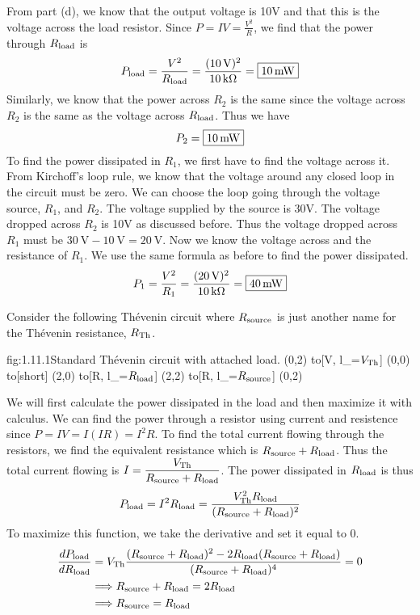 \begin{enumerate}
    From part (d), we know that the output voltage is 10V and that this is the voltage across the load resistor. Since $P = IV = \frac{V^2}{R}$, we find that the power through $R_{\text{load}}$ is 
    \[P_\load = \frac{V^2}{R_\load} = \frac{(\SI{10}{\V})^2}{\SI{10}{\kohm}} = \mans{\SI{10}{\mW}}\]
    Similarly, we know that the power across $R_2$ is the same since the voltage across $R_2$ is the same as the voltage across $R_{\text{load}}$. Thus we have
    \[P_2 = \mans{\SI{10}{\mW}}\]
    To find the power dissipated in $R_1$, we first have to find the voltage across it. From Kirchoff's loop rule, we know that the voltage around any closed loop in the circuit must be zero. We can choose the loop going through the voltage source, $R_1$, and $R_2$. The voltage supplied by the source is 30V. The voltage dropped across $R_2$ is 10V as discussed before. Thus the voltage dropped across $R_1$ must be $\SI{30}{\V} - \SI{10}{\V} = \SI{20}{\V}$. Now we know the voltage across and the resistance of $R_1$. We use the same formula as before to find the power dissipated.
    \[P_1 = \frac{V^2}{R_1} = \frac{(\SI{20}{\V})^2}{\SI{10}{\kohm}} = \mans{\SI{40}{\mW}}\]
\end{enumerate}

Consider the following Th\'evenin circuit where $R_{\text{source}}$ is just another name for the Th\'evenin resistance, $R_{\text{Th}}$.
\begin{circuit}{fig:1.11.1}{Standard Th\'evenin circuit with attached load.}
    (0,2) to[V, l_=$V_{\text{Th}}$] (0,0)
        to[short] (2,0)
        to[R, l_=$R_{\text{load}}$] (2,2)
        to[R, l_=$R_{\text{source}}$] (0,2)
\end{circuit}
We will first calculate the power dissipated in the load and then maximize it with calculus. We can find the power through a resistor using current and resistence since $P = IV = I(IR) = I^2R$. To find the total current flowing through the resistors, we find the equivalent resistance which is $R_{\text{source}} + R_{\text{load}}$. Thus the total current flowing is $I = \dfrac{V_{\text{Th}}}{R_{\text{source}} + R_{\text{load}}}$. The power dissipated in $R_{\text{load}}$ is thus 
\[P_{\text{load}} = I^2R_{\text{load}} = \dfrac{V_{\text{Th}}^2 R_{\text{load}}}{(R_{\text{source}} + R_{\text{load}})^2}\]
To maximize this function, we take the derivative and set it equal to 0.
\begin{align*}
    \frac{dP_{\text{load}}}{dR_{\text{load}}} &= V_{\text{Th}} \frac{(R_{\text{source}} + R_{\text{load}})^2 - 2R_{\text{load}}(R_{\text{source}} + R_{\text{load}})}{(R_{\text{source}} + R_{\text{load}})^4} = 0 \\
    &\Longrightarrow R_{\text{source}} + R_{\text{load}} = 2R_{\text{load}} \\
    &\Longrightarrow R_{\text{source}} = R_{\text{load}}
\end{align*}

